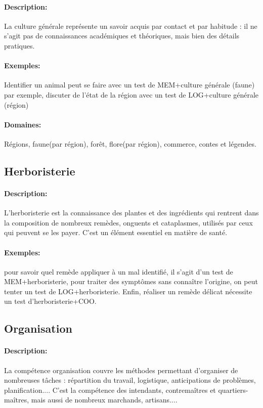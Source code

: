 \documentclass[10pt,a4paper,twocolumn]{book}
\begin{document}
\paragraph{Description:}La culture générale représente un savoir acquis par contact et par habitude : il ne s'agit pas de connaissances académiques et théoriques, mais bien des détails pratiques.
\paragraph{Exemples:}Identifier un animal peut se faire avec un test de MEM+culture générale (faune) par exemple, discuter de l'état de la région avec un test de LOG+culture générale (région)
\paragraph{Domaines:}Régions, faune(par région), forêt, flore(par région), commerce, contes et légendes.
\subsection{Herboristerie}
\paragraph{Description:}L'herboristerie est la connaissance des plantes et des ingrédients qui rentrent dans la composition de nombreux remèdes, onguents et cataplasmes, utilisés par ceux qui peuvent se les payer. C'est un élément essentiel en matière de santé.
\paragraph{Exemples:}pour savoir quel remède appliquer à un mal identifié, il s'agit d'un test de MEM+herboristerie, pour traiter des symptômes sans connaître l'origine, on peut tenter un test de LOG+herboristerie. Enfin, réaliser un remède délicat nécessite un test d'herboristerie+COO.
\subsection{Organisation}
\paragraph{Description:}La compétence organisation couvre les méthodes permettant d'organiser de nombreuses tâches : répartition du travail, logistique, anticipations de problèmes, planification.... C'est la compétence des intendants, contremaîtres et quartiers-maîtres, mais aussi de nombreux marchands, artisans....
\end{document}
